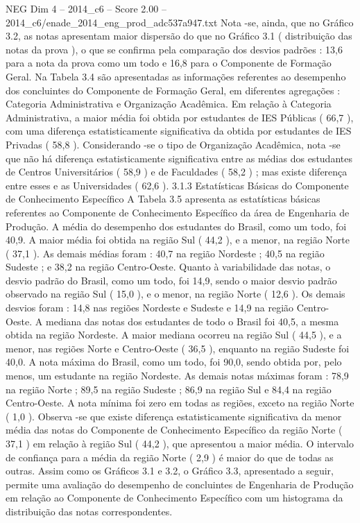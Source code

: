 \begin{textsample}{NEG Dim 4 – 2014\_c6 – Score 2.00 – 2014\_c6/enade\_2014\_eng\_prod\_adc537a947.txt}
Nota -se, ainda, que no Gráfico 3.2, as notas apresentam maior dispersão do que no Gráfico 3.1 ( distribuição das notas da prova ), o que se confirma pela comparação dos desvios padrões : 13,6 para a nota da prova como um todo e 16,8 para o Componente de Formação Geral.
Na Tabela 3.4 são apresentadas as informações referentes ao desempenho dos concluintes do Componente de Formação Geral, em diferentes agregações : Categoria Administrativa e Organização Acadêmica.
Em relação à Categoria Administrativa, a maior média foi obtida por estudantes de IES Públicas ( 66,7 ), com uma diferença estatisticamente significativa da obtida por estudantes de IES Privadas ( 58,8 ).
Considerando -se o tipo de Organização Acadêmica, nota -se que não há diferença estatisticamente significativa entre as médias dos estudantes de Centros Universitários ( 58,9 ) e de Faculdades ( 58,2 ) ; mas existe diferença entre esses e as Universidades ( 62,6 ). 3.1.3 Estatísticas Básicas do Componente de Conhecimento Específico A Tabela 3.5 apresenta as estatísticas básicas referentes ao Componente de Conhecimento Específico da área de Engenharia de Produção.
A média do desempenho dos estudantes do Brasil, como um todo, foi 40,9.
A maior média foi obtida na região Sul ( 44,2 ), e a menor, na região Norte ( 37,1 ).
As demais médias foram : 40,7 na região Nordeste ; 40,5 na região Sudeste ; e 38,2 na região Centro-Oeste.
Quanto à variabilidade das notas, o desvio padrão do Brasil, como um todo, foi 14,9, sendo o maior desvio padrão observado na região Sul ( 15,0 ), e o menor, na região Norte ( 12,6 ).
Os demais desvios foram : 14,8 nas regiões Nordeste e Sudeste e 14,9 na região Centro-Oeste.
A mediana das notas dos estudantes de todo o Brasil foi 40,5, a mesma obtida na região Nordeste.
A maior mediana ocorreu na região Sul ( 44,5 ), e a menor, nas regiões Norte e Centro-Oeste ( 36,5 ), enquanto na região Sudeste foi 40,0.
A nota máxima do Brasil, como um todo, foi 90,0, sendo obtida por, pelo menos, um estudante na região Nordeste.
As demais notas máximas foram : 78,9 na região Norte ; 89,5 na região Sudeste ; 86,9 na região Sul e 84,4 na região Centro-Oeste.
A nota mínima foi zero em todas as regiões, exceto na região Norte ( 1,0 ).
Observa -se que existe diferença estatisticamente significativa da menor média das notas do Componente de Conhecimento Específico da região Norte ( 37,1 ) em relação à região Sul ( 44,2 ), que apresentou a maior média.
O intervalo de confiança para a média da região Norte ( 2,9 ) é maior do que de todas as outras.
Assim como os Gráficos 3.1 e 3.2, o Gráfico 3.3, apresentado a seguir, permite uma avaliação do desempenho de concluintes de Engenharia de Produção em relação ao Componente de Conhecimento Específico com um histograma da distribuição das notas correspondentes.

\end{textsample}
